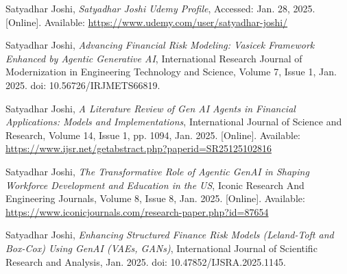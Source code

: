 \documentclass[a4paper,headinclude=on,footinclude=on,12pt,oneside]{scrbook}
\begin{document}
\begin{thebibliography}{9}
	Satyadhar Joshi, 
	\textit{Satyadhar Joshi Udemy Profile}, 
	Accessed: Jan. 28, 2025. [Online]. Available: \url{https://www.udemy.com/user/satyadhar-joshi/}
	
	
	
	
	
	
	
	
	
	
		
	Satyadhar Joshi, 
	\textit{Advancing Financial Risk Modeling: Vasicek Framework Enhanced by Agentic Generative AI}, 
	International Research Journal of Modernization in Engineering Technology and Science, Volume 7, Issue 1, Jan. 2025. doi: 10.56726/IRJMETS66819.
	

	
	Satyadhar Joshi, 
	\textit{A Literature Review of Gen AI Agents in Financial Applications: Models and Implementations}, 
	International Journal of Science and Research, Volume 14, Issue 1, pp. 1094, Jan. 2025. [Online]. Available: \url{https://www.ijsr.net/getabstract.php?paperid=SR25125102816}
	
	Satyadhar Joshi, 
	\textit{The Transformative Role of Agentic GenAI in Shaping Workforce Development and Education in the US}, 
	Iconic Research And Engineering Journals, Volume 8, Issue 8, Jan. 2025. [Online]. Available: \url{https://www.iconicjournals.com/research-paper.php?id=87654}
	
	Satyadhar Joshi, 
	\textit{Enhancing Structured Finance Risk Models (Leland-Toft and Box-Cox) Using GenAI (VAEs, GANs)}, 
	International Journal of Scientific Research and Analysis, Jan. 2025. doi: 10.47852/IJSRA.2025.1145.
	
	
	
	
	
	
	
	
	
\end{thebibliography}
\end{document}
